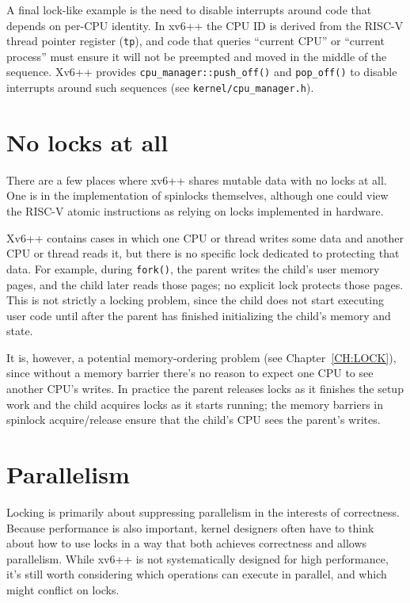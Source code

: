 A final lock-like example is the need to disable interrupts around code that
depends on per-CPU identity.
In xv6++ the CPU ID is derived from the RISC-V thread pointer register (\lstinline{tp}),
and code that queries ``current CPU'' or ``current process'' must ensure it will
not be preempted and moved in the middle of the sequence.
Xv6++ provides \lstinline{cpu_manager::push_off()} and \lstinline{pop_off()}
to disable interrupts around such sequences (see \texttt{kernel/cpu\_manager.h}).

\section{No locks at all}

There are a few places where xv6++ shares mutable data with no locks at all.
One is in the implementation of spinlocks themselves, although one could view
the RISC-V atomic instructions as relying on locks implemented in hardware.

Xv6++ contains cases in which one CPU or thread writes some data and another CPU
or thread reads it, but there is no specific lock dedicated to protecting that
data. For example, during \lstinline{fork()}, the parent writes the child's user
memory pages, and the child later reads those pages; no explicit lock protects
those pages. This is not strictly a locking problem, since the child does not
start executing user code until after the parent has finished initializing the
child's memory and state.

It is, however, a potential memory-ordering problem (see Chapter~\ref{CH:LOCK}),
since without a memory barrier there's no reason to expect one CPU to see
another CPU's writes. In practice the parent releases locks as it finishes the
setup work and the child acquires locks as it starts running; the memory barriers
in spinlock acquire/release ensure that the child's CPU sees the parent's writes.

\section{Parallelism}

Locking is primarily about suppressing parallelism in the interests of
correctness. Because performance is also important, kernel designers often have
to think about how to use locks in a way that both achieves correctness and
allows parallelism. While xv6++ is not systematically designed for high
performance, it's still worth considering which operations can execute in
parallel, and which might conflict on locks.

